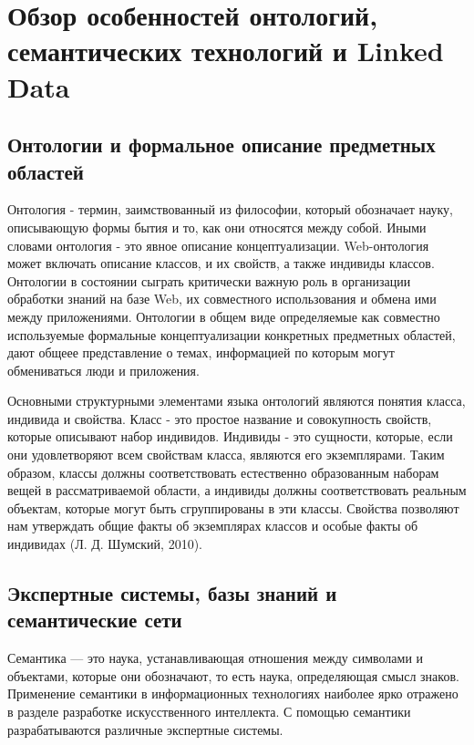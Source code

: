\chapter{Обзор особенностей онтологий, семантических технологий и Linked Data} \label{chapt2}

\section{Онтологии и формальное описание предметных областей} \label{sect2_1}
Онтология - термин, заимствованный из философии, который обозначает науку, описывающую формы бытия и то, как они относятся между собой. Иными словами онтология - это явное описание концептуализации. Web-онтология может включать описание классов, и их свойств, а также индивиды классов. Онтологии в состоянии сыграть критически важную роль в организации обработки знаний на базе Web, их совместного использования и обмена ими между приложениями. Онтологии в общем виде определяемые как совместно используемые формальные концептуализации конкретных предметных областей, дают общеее представление о темах, информацией по которым могут обмениваться люди и приложения. 

Основными структурными элементами языка онтологий являются понятия класса, индивида и свойства. Класс - это простое название и совокупность свойств, которые описывают набор индивидов. Индивиды - это сущности, которые, если они удовлетворяют всем свойствам класса, являются его экземплярами. Таким образом, классы должны соответствовать естественно образованным наборам вещей в рассматриваемой области, а индивиды должны соответствовать реальным объектам, которые могут быть сгруппированы в эти классы. Свойства позволяют нам утверждать общие факты об экземплярах классов и особые факты об индивидах (Л. Д. Шумский, 2010). 


\section{Экспертные системы, базы знаний и семантические сети} \label{sect2_2}

Семантика — это наука, устанавливающая отношения между символами и объектами, которые они обозначают, то есть наука, определяющая смысл знаков. Применение семантики в информационных технологиях наиболее ярко отражено в разделе разработке искусственного интеллекта. С помощью семантики разрабатываются различные экспертные системы.

